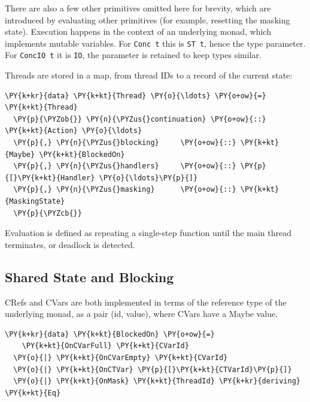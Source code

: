 There are also a few other primitives omitted here for brevity, which
are introduced by evaluating other primitives (for example, resetting
the masking state). Execution happens in the context of an underlying
monad, which implements mutable variables. For \texttt{Conc t} this is
\texttt{ST t}, hence the type parameter. For \texttt{ConcIO t} it is
\texttt{IO}, the parameter is retained to keep types similar.

Threads are stored in a map, from thread IDs to a record of the
current state:


\begin{Verbatim}[commandchars=\\\{\}]
\PY{k+kr}{data} \PY{k+kt}{Thread} \PY{o}{\ldots} \PY{o+ow}{=} \PY{k+kt}{Thread}
  \PY{p}{\PYZob{}} \PY{n}{\PYZus{}continuation} \PY{o+ow}{::} \PY{k+kt}{Action} \PY{o}{\ldots}
  \PY{p}{,} \PY{n}{\PYZus{}blocking}     \PY{o+ow}{::} \PY{k+kt}{Maybe} \PY{k+kt}{BlockedOn}
  \PY{p}{,} \PY{n}{\PYZus{}handlers}     \PY{o+ow}{::} \PY{p}{[}\PY{k+kt}{Handler} \PY{o}{\ldots}\PY{p}{]}
  \PY{p}{,} \PY{n}{\PYZus{}masking}      \PY{o+ow}{::} \PY{k+kt}{MaskingState}
  \PY{p}{\PYZcb{}}
\end{Verbatim}

Evaluation is defined as repeating a single-step function until the
main thread terminates, or deadlock is detected.

\subsection*{Shared State and Blocking}
\label{sec:dejafu-impl-state}

CRefs and CVars are both implemented in terms of the reference type of
the underlying monad, as a pair (id, value), where CVars have a Maybe
value.


\begin{Verbatim}[commandchars=\\\{\}]
\PY{k+kr}{data} \PY{k+kt}{BlockedOn} \PY{o+ow}{=}
    \PY{k+kt}{OnCVarFull} \PY{k+kt}{CVarId}
  \PY{o}{|} \PY{k+kt}{OnCVarEmpty} \PY{k+kt}{CVarId}
  \PY{o}{|} \PY{k+kt}{OnCTVar} \PY{p}{[}\PY{k+kt}{CTVarId}\PY{p}{]}
  \PY{o}{|} \PY{k+kt}{OnMask} \PY{k+kt}{ThreadId} \PY{k+kr}{deriving} \PY{k+kt}{Eq}
\end{Verbatim}

